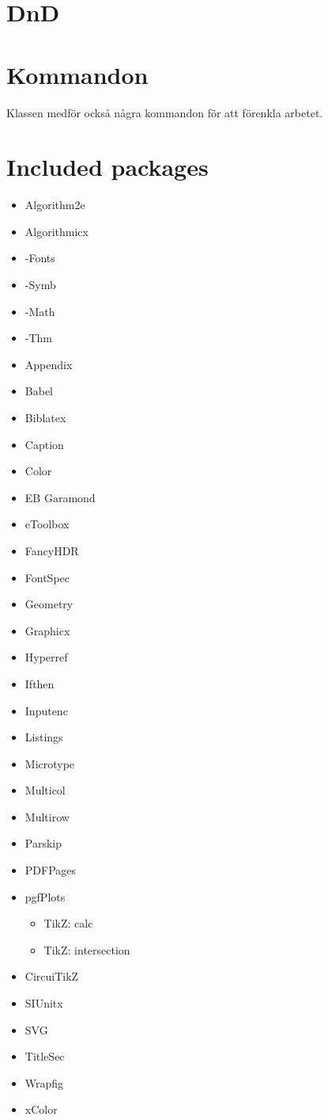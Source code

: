 \documentclass[Swedish,long,twocolumn]{KajsClass}
\begin{document}
\segline
\section{DnD}\label{sec:DnD}
\blindtext
    
\segline
\section{Kommandon}\label{sec:Commands}
Klassen medför också några kommandon för att förenkla arbetet. 

    
\segline
\section{Included packages}\label{sec:Packages}
\blindtext
\newpage
\begin{itemize}
        \item Algorithm2e
        \item Algorithmicx
        \item \AmS-Fonts
        \item \AmS-Symb
        \item \AmS-Math
        \item \AmS-Thm
        \item Appendix
        \item Babel
        \item Biblatex
        \item Caption
        \item Color
        \item EB Garamond
        \item eToolbox
        \item FancyHDR
        \item FontSpec
        \item Geometry
        \item Graphicx
        \item Hyperref
        \item Ifthen
        \item Inputenc
        \item Listings
        \item Microtype
        \item Multicol
        \item Multirow
        \item Parskip
        \item PDFPages
        \item pgfPlots
        \begin{itemize}
            \item TikZ: calc
            \item TikZ: intersection
        \end{itemize}
        \item CircuiTikZ
        \item SIUnitx
        \item SVG
        \item TitleSec
        \item Wrapfig
        \item xColor
    \end{itemize}
\end{document}
